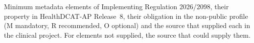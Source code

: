 \begin{table}[!htb]
\caption{Minimum metadata elements of Implementing Regulation 2026/2098, their property
in HealthDCAT-AP Release~8, their obligation in the non-public profile (M mandatory,
R recommended, O optional) and the source that supplied each in the clinical project.
For elements not supplied, the source that could supply them.}
\label{tab:elements}
\footnotesize

\end{table}
